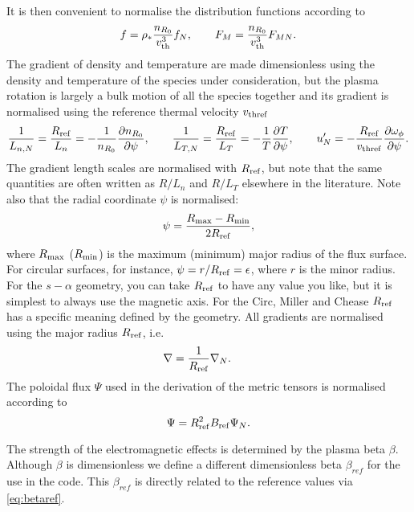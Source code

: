 It is then convenient to normalise the distribution functions according to 
\begin{equation} 
f = \rho_* {n_{R_0} \over v_{\rm th}^3} f_N ,
\qquad 
F_M = {n_{R_0} \over v_{\rm th}^3} F_{MN} .
\end{equation} 
The gradient of density and temperature are made dimensionless using the density and 
temperature of the species under consideration, but the plasma rotation 
is largely a bulk motion of all the species together and its gradient is normalised using  
the reference thermal velocity $v_{\rm thref}$
\begin{equation} 
\label{eq:gradients}
{1 \over L_{n,N}} = {R_{\rm ref} \over L_n} = - {1\over n_{R_0}} \frac{\partial  n_{R_0} }{\partial \psi} ,
\qquad 
{1 \over L_{T,N}} = {R_{\rm ref} \over L_T} = - {1 \over T} \frac{\partial  T }{\partial \psi} , 
\qquad 
u^\prime_N = - {R_{\rm ref} \over v_{\rm thref}} \frac{\partial  \omega_\phi}{\partial \psi} .
\end{equation}
The gradient length scales are normalised with $R_{\rm ref}$, but note that the same quantities are often written 
as $R/L_n$ and $R/L_T$ elsewhere in the literature.  Note also that the radial coordinate $\psi$ is normalised:
\begin{equation}
 \label{eq:psi-def}
 \psi = \frac{R_{\rm max}-R_{\rm min}}{2R_{\rm ref}},
\end{equation}
where $R_{\rm max}$ ($R_{\rm min}$) is the maximum (minimum) major radius of the flux 
surface. 
For circular surfaces, for instance, $\psi = r / R_{\rm ref} = \epsilon$, 
where $r$ is the minor radius.  For the $s-\alpha$ geometry, you can take $R_{\rm ref}$ to have any 
value you like, but it is simplest to always use the magnetic axis. For the Circ, Miller and Chease $R_{\rm ref}$ 
has a specific meaning defined by the geometry.
All gradients are normalised using the major radius $R_{\rm ref}$,
i.e.
\begin{equation} 
\nabla = {1\over R_{\rm ref}} \nabla_{N} .\qquad 
\end{equation} 
The poloidal flux $\Psi$ used in the derivation of the metric tensors is normalised according to
\begin{equation} 
 \Psi = R_{\rm ref}^2 B_{\rm ref}\Psi_N .
\end{equation}

The strength of the electromagnetic effects is determined by the plasma beta $\beta$.  
Although $\beta$ is dimensionless we define a different dimensionless beta $\beta_{ref}$ for the 
use in the code. This $\beta_{ref}$ is directly related to the reference values via \eqref{eq:betaref}.



